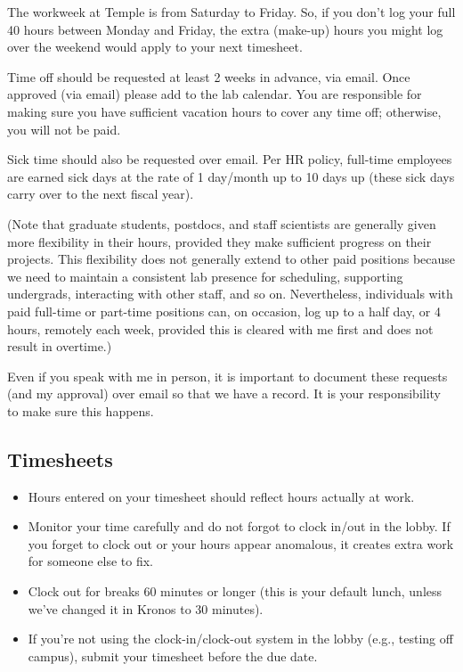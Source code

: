 \documentclass[letterpaper,11pt,oneside]{memoir}
\begin{document}
The workweek at Temple is from Saturday to Friday. So, if you don't log your full 40 hours between Monday and Friday, the extra (make-up) hours you might log over the weekend would apply to your next timesheet. 

Time off should be requested at least 2 weeks in advance, via email. Once approved (via email) please add to the lab calendar. You are responsible for making sure you have sufficient vacation hours to cover any time off; otherwise, you will not be paid.

Sick time should also be requested over email. Per HR policy, full-time employees are earned sick days at the rate of 1 day/month up to 10 days up (these sick days carry over to the next fiscal year).

(Note that graduate students, postdocs, and staff scientists are generally given more flexibility in their hours, provided they make sufficient progress on their projects. This flexibility does not generally extend to other paid positions because we need to maintain a consistent lab presence for scheduling, supporting undergrads, interacting with other staff, and so on. Nevertheless, individuals with paid full-time or part-time positions can, on occasion, log up to a half day, or 4 hours, remotely each week, provided this is cleared with me first and does not result in overtime.)

\begin{shaded}
\noindent Even if you speak with me in person, it is important to document these requests (and my approval) over email so that we have a record. It is your responsibility to make sure this happens.
\end{shaded}

\subsection{Timesheets}

\begin{itemize}
\item Hours entered on your timesheet should reflect hours actually at work.
\item Monitor your time carefully and do not forgot to clock in/out in the lobby. If you forget to clock out or your hours appear anomalous, it creates extra work for someone else to fix. 
\item Clock out for breaks 60 minutes or longer (this is your default lunch, unless we've changed it in Kronos to 30 minutes).
\item If you're not using the clock-in/clock-out system in the lobby (e.g., testing off campus), submit your timesheet before the due date.
\end{itemize}
\end{document}
